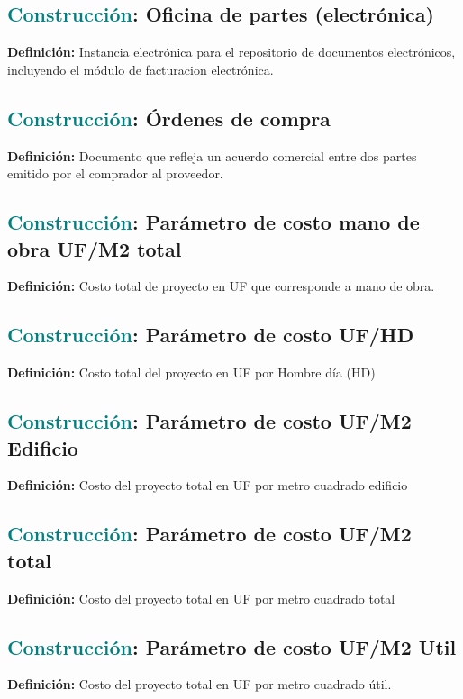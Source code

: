 \documentclass[12pt]{article}
\begin{document}
\subsection{\textcolor{teal}{Construcción}: Oficina de partes (electrónica)}
\textbf{Definición:} Instancia electrónica para el repositorio de documentos electrónicos, incluyendo el módulo de facturacion electrónica.
\subsection{\textcolor{teal}{Construcción}: Órdenes de compra}
\textbf{Definición:} Documento que refleja un acuerdo comercial entre dos partes emitido por el comprador al proveedor.
\subsection{\textcolor{teal}{Construcción}: Parámetro de costo mano de obra UF/M2 total}
\textbf{Definición:} Costo total de proyecto en UF que corresponde a mano de obra.
\subsection{\textcolor{teal}{Construcción}: Parámetro de costo UF/HD}
\textbf{Definición:} Costo total del proyecto en UF por Hombre día (HD)
\subsection{\textcolor{teal}{Construcción}: Parámetro de costo UF/M2 Edificio}
\textbf{Definición:} Costo del proyecto total en UF por metro cuadrado edificio
\subsection{\textcolor{teal}{Construcción}: Parámetro de costo UF/M2 total}
\textbf{Definición:} Costo del proyecto total en UF por metro cuadrado total
\subsection{\textcolor{teal}{Construcción}: Parámetro de costo UF/M2 Util}
\textbf{Definición:} Costo del proyecto total en UF por metro cuadrado útil.
\end{document}
